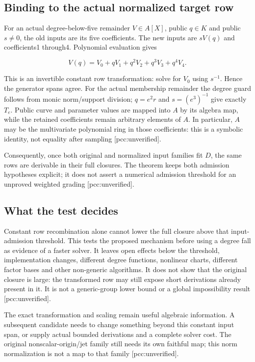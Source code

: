 \documentclass[
  10pt,
]{article}
\begin{document}
\subsection{Binding to the actual normalized target
row}\label{binding-to-the-actual-normalized-target-row}

For an actual degree-below-five remainder \(V\in A[X]\), public
\(q\in K\) and public \(s\ne0\), the old inputs are its five
coefficients. The new inputs are \(sV(q)\) and coefficients1 through4.
Polynomial evaluation gives

\[
V(q)=V_0+qV_1+q^2V_2+q^3V_3+q^4V_4.
\]

This is an invertible constant row transformation: solve for \(V_0\)
using \(s^{-1}\). Hence the generator spans agree. For the actual
membership remainder the degree guard follows from monic norm/support
division; \(q=e^2r\) and \(s=(e^3)^{-1}\) give exactly \(T_e\). Public
curve and parameter values are mapped into \(A\) by its algebra map,
while the retained coefficients remain arbitrary elements of \(A\). In
particular, \(A\) may be the multivariate polynomial ring in those
coefficients: this is a symbolic identity, not equality after sampling
{[}pcc:unverified{]}.

Consequently, once both original and normalized input families fit
\(D\), the same rows are derivable in their full closures. The theorem
keeps both admission hypotheses explicit; it does not assert a numerical
admission threshold for an unproved weighted grading
{[}pcc:unverified{]}.

\subsection{What the test decides}\label{what-the-test-decides}

Constant row recombination alone cannot lower the full closure above
that input-admission threshold. This tests the proposed mechanism before
using a degree fall as evidence of a faster solver. It leaves open
effects below the threshold, implementation changes, different degree
functions, nonlinear charts, different factor bases and other
non-generic algorithms. It does not show that the original closure is
large: the transformed row may still expose short derivations already
present in it. It is not a generic-group lower bound or a global
impossibility result {[}pcc:unverified{]}.

The exact transformation and scaling remain useful algebraic
information. A subsequent candidate needs to change something beyond
this constant input span, or supply actual bounded derivations and a
complete solver cost. The original nonscalar-origin/jet family still
needs its own faithful map; this norm normalization is not a map to that
family {[}pcc:unverified{]}.
\end{document}
